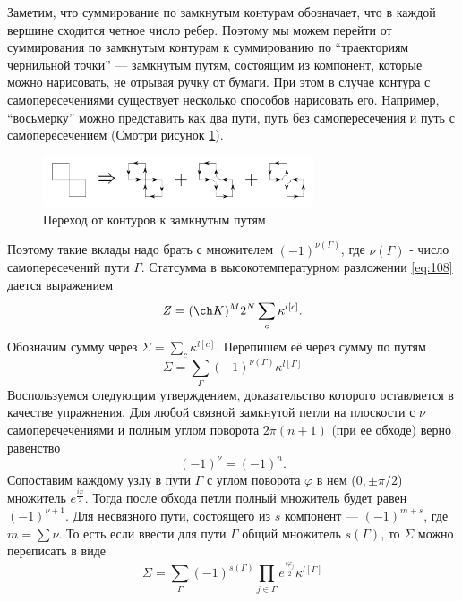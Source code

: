 \documentclass[a4paper,12pt]{article}
\theoremstyle{definition}
\theoremstyle{definition}
\theoremstyle{definition}
\begin{document}
Заметим, что суммирование по замкнутым контурам обозначает, что в каждой вершине сходится четное число ребер. Поэтому мы можем перейти от суммирования по замкнутым контурам к суммированию по ``траекториям чернильной точки'' --- замкнутым путям, состоящим из компонент, которые можно нарисовать, не отрывая ручку от бумаги. При этом в случае контура с самопересечениями существует несколько способов нарисовать его. Например, ``восьмерку'' можно представить как два пути, путь без самопересечения и путь с самопересечением (Смотри рисунок \ref{fig:ising-1}).
\begin{figure}[h!tb]
  \centering
    \includegraphics[width=80mm]{ising1}
  \caption{Переход от контуров к замкнутым путям}
  \label{fig:ising-1}
\end{figure}
Поэтому такие вклады надо брать с множителем $(-1)^{\nu(\Gamma)}$, где $\nu(\Gamma)$ - число самопересечений пути $\Gamma$.
Статсумма в высокотемпературном разложении \eqref{eq:108} дается выражением
\begin{equation}
  \label{eq:113}
  Z=(\ch K)^M 2^N\sum_c \kappa^{l[c]}.
\end{equation}
Обозначим сумму через $\Sigma=\sum_c \kappa^{l[c]}$. Перепишем её через сумму по путям
\begin{equation}
  \label{eq:114}
  \Sigma=\sum_{\Gamma}(-1)^{\nu(\Gamma)} \kappa^{l[\Gamma]}
\end{equation}
Воспользуемся следующим утверждением, доказательство которого оставляется в качестве упражнения. Для любой связной замкнутой петли на плоскости с $\nu$ самоперечечениями и полным углом поворота $2\pi(n+1)$ (при ее обходе) верно равенство
\begin{equation}
  \label{eq:115}
  (-1)^{\nu}=(-1)^n.
\end{equation}
Сопоставим каждому узлу в пути $\Gamma$ с углом поворота $\varphi$ в нем ($0,\pm \pi/2$) множитель $e^{\frac{i\varphi}{2}}$. Тогда после обхода петли полный множитель будет равен $(-1)^{\nu+1}$. Для несвязного пути, состоящего из $s$ компонент --- $(-1)^{m+s}$, где $m=\sum \nu$. То есть если ввести для пути $\Gamma$ общий множитель $s(\Gamma)$, то $\Sigma$ можно переписать в виде
\begin{equation}
  \label{eq:116}
  \Sigma=\sum_{\Gamma}(-1)^{s(\Gamma)}\prod_{j\in \Gamma} e^{\frac{i\varphi_j}{2}}\kappa^{l[\Gamma]}
\end{equation}
\end{document}
